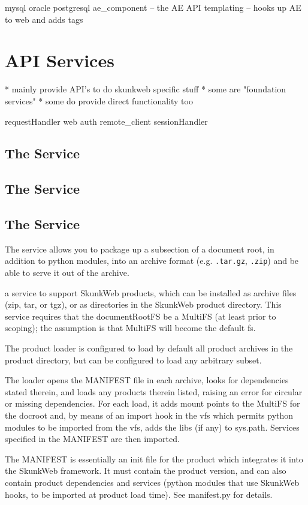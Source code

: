 \documentclass{manual}
\begin{document}
       mysql
       oracle
       postgresql
       ae_component -- the AE API
       templating -- hooks up AE to web and adds tags

\section{API Services}
       * mainly provide API's to do skunkweb specific stuff
       * some are "foundation services"
       * some do provide direct functionality too

       requestHandler
       web
       auth
       remote_client
       sessionHandler

\subsection{The  Service}
\subsection{The  Service}
\subsection{The  Service}
The  service allows you to package up a subsection of
a document root, in addition to python modules, into an archive format
(e.g. \texttt{.tar.gz}, \texttt{.zip}) and be able to serve it out of
the archive.


a service to support SkunkWeb products, which can be installed as
archive files (zip, tar, or tgz), or as directories in the SkunkWeb
product directory.  This service requires that the documentRootFS be a
MultiFS (at least prior to scoping); the assumption is that MultiFS
will become the default fs.

The product loader is configured to load by default all product
archives in the product directory, but can be configured to load any
arbitrary subset.

The loader opens the MANIFEST file in each archive, looks for
dependencies stated therein, and loads any products therein listed,
raising an error for circular or missing dependencies.  For each load,
it adds mount points to the MultiFS for the docroot and, by means of
an import hook in the vfs which permits python modules to be imported
from the vfs, adds the libs (if any) to sys.path.  Services specified
in the MANIFEST are then imported.

The MANIFEST is essentially an init file for the product which
integrates it into the SkunkWeb framework.  It must contain the
product version, and can also contain product dependencies and
services (python modules that use SkunkWeb hooks, to be imported at
product load time).  See manifest.py for details.
\end{document}
